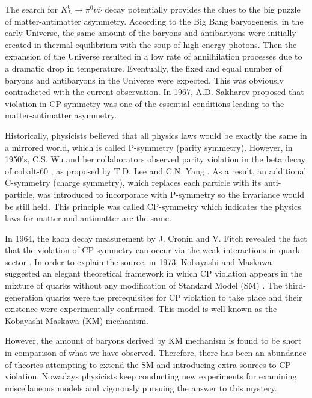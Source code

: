 
The search for ${K_L^0 \to \pi^0 \nu \overline{\nu}}$ decay potentially provides the clues to the big puzzle of matter-antimatter asymmetry. According to the Big Bang baryogenesis, in the early Universe, the same amount of the baryons and antibariyons were initially created in thermal equilibrium with the soup of high-energy photons. Then the expansion of the Universe resulted in a low rate of annilhilation processes due to a dramatic drop in temperature. Eventually, the fixed and equal number of baryons and antibaryons in the Universe were expected. This was obviously contradicted with the current observation. In 1967, A.D. Sakharov \parencite{Sakharov} proposed that violation in CP-symmetry was one of the essential conditions leading to the matter-antimatter asymmetry.

Historically, physicists believed that all physics laws would be exactly the same in a mirrored world, which is called P-symmetry (parity symmetry). However, in 1950’s, C.S. Wu and her collaborators observed parity violation in the beta decay of cobalt-60 \parencite{P_violation_exp}, as proposed by T.D. Lee and C.N. Yang \parencite{P_theory}. As a result, an additional C-symmetry (charge symmetry), which replaces each particle with its anti-particle, was introduced to incorporate with P-symmetry so the invariance would be still held. This principle was called CP-symmetry which indicates the physics laws for matter and antimatter are the same.

In 1964, the kaon decay measurement by J. Cronin and V. Fitch revealed the fact that the violation of CP symmetry can occur via the weak interactions in quark sector \parencite{K_CPviolation_exp}. In order to explain the source, in 1973, Kobayashi and Maskawa suggested an elegant theoretical framework in which CP violation  appears in the mixture of quarks without any modification of Standard Model (SM) \parencite{KM}. The third-generation quarks were the prerequisites for CP violation to take place and their existence were experimentally confirmed. This model is well known as the Kobayashi-Maskawa (KM) mechanism.

However, the amount of baryons derived by KM mechanism is found to be short in comparison of what we have observed. Therefore, there has been an abundance of theories attempting to extend the SM and introducing extra sources to CP violation. Nowadays physicists keep conducting new experiments for examining miscellaneous models and vigorously pursuing the answer to this mystery.  

